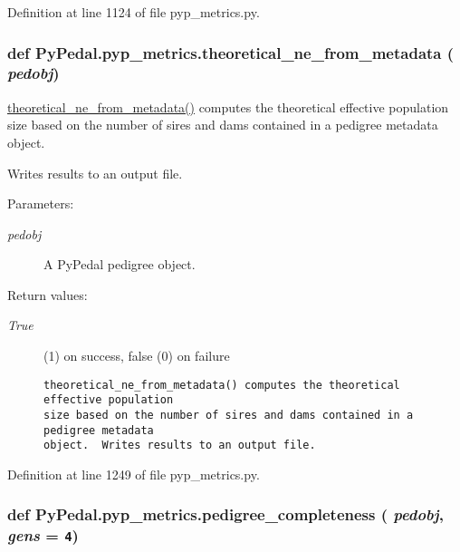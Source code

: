 Definition at line 1124 of file pyp\_\-metrics.py.\hypertarget{namespacePyPedal_1_1pyp__metrics_11dc9cb957ff03c709cecd2cbb996e33}{
\subsubsection[theoretical\_\-ne\_\-from\_\-metadata]{\setlength{\rightskip}{0pt plus 5cm}def Py\-Pedal.pyp\_\-metrics.theoretical\_\-ne\_\-from\_\-metadata ( {\em pedobj})}}
\label{namespacePyPedal_1_1pyp__metrics_11dc9cb957ff03c709cecd2cbb996e33}


\hyperlink{namespacePyPedal_1_1pyp__metrics_11dc9cb957ff03c709cecd2cbb996e33}{theoretical\_\-ne\_\-from\_\-metadata()} computes the theoretical effective population size based on the number of sires and dams contained in a pedigree metadata object. 

Writes results to an output file. \begin{Desc}
\item[Parameters:]
\begin{description}
\item[{\em pedobj}]A Py\-Pedal pedigree object. \end{description}
\end{Desc}
\begin{Desc}
\item[Return values:]
\begin{description}
\item[{\em True}](1) on success, false (0) on failure

\footnotesize\begin{verbatim}theoretical_ne_from_metadata() computes the theoretical effective population
size based on the number of sires and dams contained in a pedigree metadata
object.  Writes results to an output file.
\end{verbatim}
\normalsize
 \end{description}
\end{Desc}


Definition at line 1249 of file pyp\_\-metrics.py.\hypertarget{namespacePyPedal_1_1pyp__metrics_9839b790d3161aaf080c649adcdaff26}{
\subsubsection[pedigree\_\-completeness]{\setlength{\rightskip}{0pt plus 5cm}def Py\-Pedal.pyp\_\-metrics.pedigree\_\-completeness ( {\em pedobj},  {\em gens} = {\tt 4})}}
\label{namespacePyPedal_1_1pyp__metrics_9839b790d3161aaf080c649adcdaff26}


